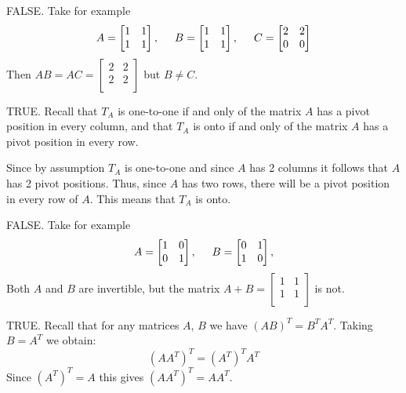 {\small
\benu

\item[\bf a)] FALSE. Take for example
$$
A = 
\begin{bmatrix}
1 & 1 \\
1 &  1 \\
\end{bmatrix},
\hskip  5mm
B = 
\begin{bmatrix}
1 &  1 \\
1 &  1 \\
\end{bmatrix},
\hskip  5mm
C = 
\begin{bmatrix}
2 & 2 \\
0 &  0 \\
\end{bmatrix}
$$
Then  $AB = AC = \begin{bmatrix} 2 & 2 \\ 2 &  2 \\ \end{bmatrix}$ but $B \neq C$. 

\vskip 5mm


\item[\bf b)] TRUE.  Recall that  $T_A$ is one-to-one if and only of the matrix $A$
has a pivot position in every column, and that  $T_A$ is onto if and only of the matrix $A$
has a pivot position in every row. 

Since by assumption $T_A$ is one-to-one and since $A$ has 2 columns it follows that $A$ has 
2 pivot positions. Thus, since $A$ has two rows, there will be a pivot position in every row of $A$. 
This  means that $T_A$ is onto. 
   


\vskip 5mm

\item[\bf c)]  FALSE. Take for example 
$$
A = 
\begin{bmatrix}
1 & 0 \\
0 &  1 \\
\end{bmatrix},
\hskip  5mm
B = 
\begin{bmatrix}
0 & 1 \\
1 &  0 \\
\end{bmatrix},
$$
Both $A$ and $B$ are invertible, but the matrix $A+B = \begin{bmatrix} 1 & 1 \\ 1 &  1 \\ \end{bmatrix}$ is not. 

\vskip 5mm

\item[\bf d)] TRUE.  Recall that for any matrices $A$, $B$ we have $(AB)^T = B^T A^T$. 
Taking $B = A^T$ we obtain:
$$(AA^T)^T =  (A^T)^T A^T$$   
 Since $(A^T)^T = A$ this gives $(AA^T)^T = AA^T$. 




\eenu
}



